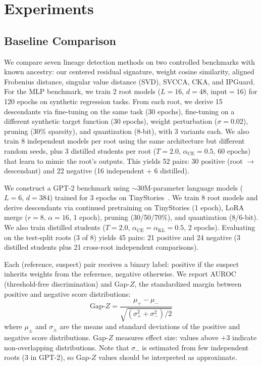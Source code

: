 \section{Experiments}\label{sec:experiments}


\subsection{Baseline Comparison}\label{sec:exp-baselines}

We compare seven lineage detection methods on two controlled benchmarks with known ancestry: our centered residual signature, weight cosine similarity, aligned Frobenius distance, singular value distance (SVD), SVCCA, CKA, and IPGuard. For the MLP benchmark, we train 2 root models ($L{=}16$, $d{=}48$, input$=$16) for 120 epochs on synthetic regression tasks. From each root, we derive 15 descendants via fine-tuning on the same task (30 epochs), fine-tuning on a different synthetic target function (30 epochs), weight perturbation ($\sigma{=}0.02$), pruning (30\% sparsity), and quantization (8-bit), with 3 variants each. We also train 8 independent models per root using the same architecture but different random seeds, plus 3 distilled students per root ($T{=}2.0$, $\alpha_{\mathrm{CE}}{=}0.5$, 60 epochs) that learn to mimic the root's outputs. This yields 52 pairs: 30 positive (root $\to$ descendant) and 22 negative (16 independent + 6 distilled).

We construct a GPT-2 benchmark using ${\sim}$30M-parameter language models ($L{=}6$, $d{=}384$) trained for 3 epochs on TinyStories~\citep{eldan2023tinystories}. We train 8 root models and derive descendants via continued pretraining on TinyStories (1 epoch), LoRA merge ($r{=}8$, $\alpha{=}16$, 1 epoch), pruning (30/50/70\%), and quantization (8/6-bit). We also train distilled students ($T{=}2.0$, $\alpha_{\mathrm{CE}}{=}\alpha_{\mathrm{KL}}{=}0.5$, 2 epochs). Evaluating on the test-split roots (3 of 8) yields 45 pairs: 21 positive and 24 negative (3 distilled students plus 21 cross-root independent comparisons).

Each (reference, suspect) pair receives a binary label: positive if the suspect inherits weights from the reference, negative otherwise. We report AUROC (threshold-free discrimination) and Gap-$Z$, the standardized margin between positive and negative score distributions:
\begin{equation}\label{eq:gap-z}
\text{Gap-}Z = \frac{\mu_+ - \mu_-}{\sqrt{(\sigma_+^2 + \sigma_-^2)/2}}
\end{equation}
where $\mu_\pm$ and $\sigma_\pm$ are the means and standard deviations of the positive and negative score distributions. Gap-$Z$ measures effect size: values above $+3$ indicate non-overlapping distributions. Note that $\sigma_-$ is estimated from few independent roots (3 in GPT-2), so Gap-$Z$ values should be interpreted as approximate.

